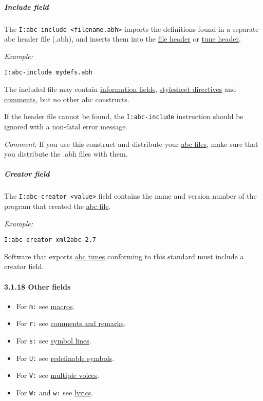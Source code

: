 \hypertarget{include_field}{\subparagraph{Include
field}\label{include_field}}

The \texttt{I:abc-include\ \textless{}filename.abh\textgreater{}}
imports the definitions found in a separate abc header file (.abh), and
inserts them into the \protect\hyperlink{file_header_definition}{file
header} or \protect\hyperlink{tune_header_definition}{tune header}.

\emph{Example:}

\begin{verbatim}
I:abc-include mydefs.abh
\end{verbatim}

The included file may contain
\protect\hyperlink{information_field_definition}{information fields},
\protect\hyperlink{stylesheet_directive_definition}{stylesheet
directives} and \protect\hyperlink{comments_and_remarks}{comments}, but
no other abc constructs.

If the header file cannot be found, the \texttt{I:abc-include}
instruction should be ignored with a non-fatal error message.

\emph{Comment:} If you use this construct and distribute your
\protect\hyperlink{abc_file_definition}{abc files}, make sure that you
distribute the .abh files with them.

\hypertarget{creator_field}{\subparagraph{Creator
field}\label{creator_field}}

The \texttt{I:abc-creator\ \textless{}value\textgreater{}} field
contains the name and version number of the program that created the
\protect\hyperlink{abc_file_definition}{abc file}.

\emph{Example:}

\begin{verbatim}
I:abc-creator xml2abc-2.7
\end{verbatim}

Software that exports \protect\hyperlink{abc_tune_definition}{abc tunes}
conforming to this standard must include a creator field.

\hypertarget{other_fields}{\paragraph{3.1.18 Other
fields}\label{other_fields}}

\begin{itemize}
\item
  For \texttt{m:} see \protect\hyperlink{macros}{macros}.
\item
  For \texttt{r:} see \protect\hyperlink{comments_and_remarks}{comments
  and remarks}.
\item
  For \texttt{s:} see \protect\hyperlink{symbol_lines}{symbol lines}.
\item
  For \texttt{U:} see
  \protect\hyperlink{redefinable_symbols}{redefinable symbols}.
\item
  For \texttt{V:} see \protect\hyperlink{multiple_voices}{multiple
  voices}.
\item
  For \texttt{W:} and \texttt{w:} see
  \protect\hyperlink{lyrics}{lyrics}.
\end{itemize}

